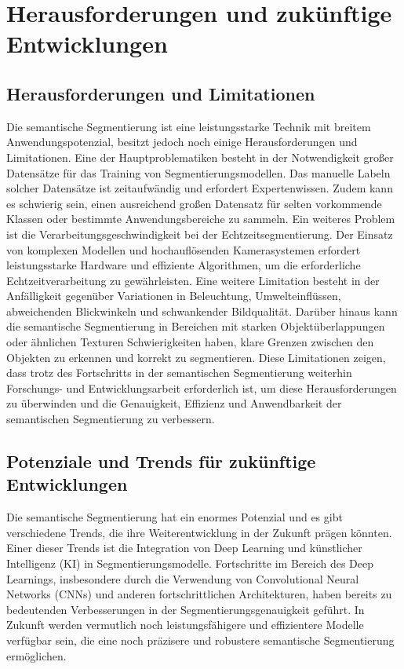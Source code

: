 \chapter{Herausforderungen und zukünftige Entwicklungen}
\section{Herausforderungen und Limitationen}
Die semantische Segmentierung ist eine leistungsstarke Technik mit breitem
Anwendungspotenzial, besitzt jedoch noch einige Herausforderungen und
Limitationen. Eine der Hauptproblematiken besteht in der Notwendigkeit großer
Datensätze für das Training von Segmentierungsmodellen. Das manuelle Labeln
solcher Datensätze ist zeitaufwändig und erfordert Expertenwissen. Zudem kann
es schwierig sein, einen ausreichend großen Datensatz für selten vorkommende
Klassen oder bestimmte Anwendungsbereiche zu sammeln. Ein weiteres Problem ist
die Verarbeitungsgeschwindigkeit bei der Echtzeitsegmentierung. Der Einsatz von
komplexen Modellen und hochauflösenden Kamerasystemen erfordert leistungsstarke
Hardware und effiziente Algorithmen, um die erforderliche Echtzeitverarbeitung
zu gewährleisten. Eine weitere Limitation besteht in der Anfälligkeit gegenüber
Variationen in Beleuchtung, Umwelteinflüssen, abweichenden Blickwinkeln und schwankender
Bildqualität. Darüber hinaus kann die semantische Segmentierung in Bereichen
mit starken Objektüberlappungen oder ähnlichen Texturen Schwierigkeiten haben,
klare Grenzen zwischen den Objekten zu erkennen und korrekt zu segmentieren.
Diese Limitationen zeigen, dass trotz des Fortschritts in der semantischen
Segmentierung weiterhin Forschungs- und Entwicklungsarbeit erforderlich ist, um
diese Herausforderungen zu überwinden und die Genauigkeit, Effizienz und
Anwendbarkeit der semantischen Segmentierung zu verbessern.

\section{Potenziale und Trends für zukünftige Entwicklungen}

Die semantische Segmentierung hat ein enormes Potenzial und es gibt
verschiedene Trends, die ihre Weiterentwicklung in der Zukunft prägen könnten.
Einer dieser Trends ist die Integration von Deep Learning und künstlicher
Intelligenz (KI) in Segmentierungsmodelle. Fortschritte im Bereich des Deep
Learnings, insbesondere durch die Verwendung von Convolutional Neural Networks
(CNNs) und anderen fortschrittlichen Architekturen, haben bereits zu
bedeutenden Verbesserungen in der Segmentierungsgenauigkeit geführt. In Zukunft
werden vermutlich noch leistungsfähigere und effizientere Modelle
verfügbar sein, die eine noch präzisere und robustere semantische Segmentierung
ermöglichen.

